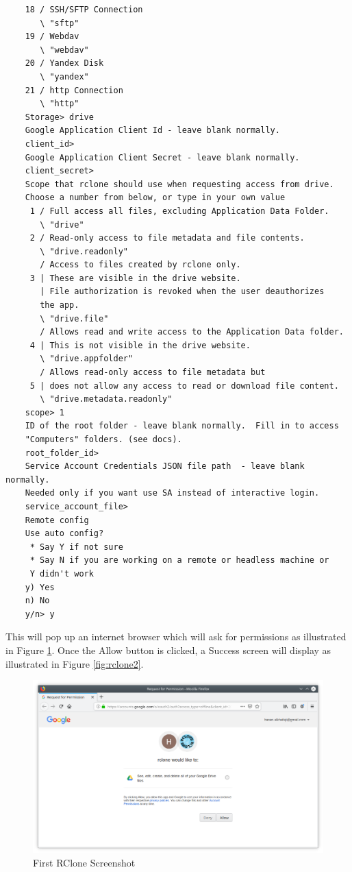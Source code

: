 \begin{verbatim}
    18 / SSH/SFTP Connection
       \ "sftp"
    19 / Webdav
       \ "webdav"
    20 / Yandex Disk
       \ "yandex"
    21 / http Connection
       \ "http"
    Storage> drive
    Google Application Client Id - leave blank normally.
    client_id> 
    Google Application Client Secret - leave blank normally.
    client_secret> 
    Scope that rclone should use when requesting access from drive.
    Choose a number from below, or type in your own value
     1 / Full access all files, excluding Application Data Folder.
       \ "drive"
     2 / Read-only access to file metadata and file contents.
       \ "drive.readonly"
       / Access to files created by rclone only.
     3 | These are visible in the drive website.
       | File authorization is revoked when the user deauthorizes 
       the app.
       \ "drive.file"
       / Allows read and write access to the Application Data folder.
     4 | This is not visible in the drive website.
       \ "drive.appfolder"
       / Allows read-only access to file metadata but
     5 | does not allow any access to read or download file content.
       \ "drive.metadata.readonly"
    scope> 1
    ID of the root folder - leave blank normally.  Fill in to access 
    "Computers" folders. (see docs).
    root_folder_id> 
    Service Account Credentials JSON file path  - leave blank normally.
    Needed only if you want use SA instead of interactive login.
    service_account_file> 
    Remote config
    Use auto config?
     * Say Y if not sure
     * Say N if you are working on a remote or headless machine or 
     Y didn't work
    y) Yes
    n) No
    y/n> y
\end{verbatim}
This will pop up an internet browser which will ask for permissions as illustrated in Figure \ref{fig:rclone1}. Once the Allow button is clicked, a Success screen will display as illustrated in Figure \ref{fig:rclone2}.

\begin{figure}[htb]
  \centering
  \includegraphics[scale=0.4]{images/rclone1.png}
  \caption{First RClone Screenshot}
  \label{fig:rclone1}
\end{figure}

